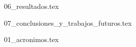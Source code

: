\documentclass[minitoc, hidelinks, headlogo, framedcover]{tfeEPCC}
\begin{document}
{06_resultados.tex}

{07_conclusiones_y_trabajos_futuros.tex}


\startappendices

{01_acronimos.tex}

\pagebreak
\pagestyle{empty}
\makebibliography
\end{document}
